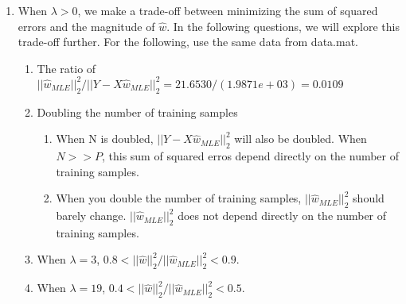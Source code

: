 \documentclass[english]{article}
\begin{document}
\begin{enumerate}
  \item When $\lambda > 0$, we make a trade-off between minimizing the sum of squared errors and the magnitude of $\hat{w}$. In the following questions, we will explore this trade-off further. For the following, use the same data from data.mat.
  \begin{enumerate}
    \item The ratio of $||\hat{w}_{MLE}||_2^2/||Y-X\hat{w}_{MLE}||_2^2=21.6530/(1.9871e+03)=\boxed{0.0109}$
    \item Doubling the number of training samples
    \begin{enumerate}
      \item When N is doubled, $||Y-X\hat{w}_{MLE}||_2^2$ will also be doubled. When $N>>P$, this sum of squared erros depend directly on the number of training samples.
      \item When you double the number of training samples, $||\hat{w}_{MLE}||_2^2$ should barely change. $||\hat{w}_{MLE}||_2^2$ does not depend directly on the number of training samples.
    \end{enumerate}
    \item When $\boxed{\lambda = 3}$, $0.8<||\hat{w}||_2^2/||\hat{w}_{MLE}||_2^2<0.9$.
    \item When $\boxed{\lambda = 19}$, $0.4<||\hat{w}||_2^2/||\hat{w}_{MLE}||_2^2<0.5$.
  \end{enumerate}
  
  \end{enumerate}
  \clearpage
\end{document}

